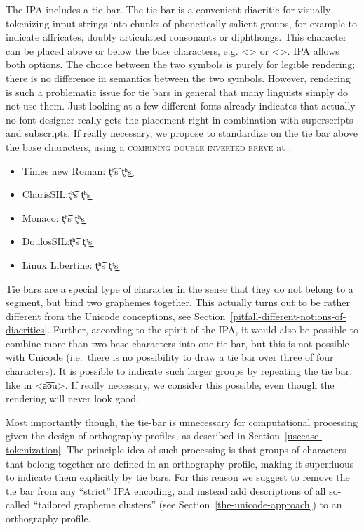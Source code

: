The IPA includes a tie bar. The tie-bar is a convenient diacritic for visually
tokenizing input strings into chunks of phonetically salient groups, for example
to indicate affricates, doubly articulated consonants or diphthongs. This
character can be placed above or below the base characters, e.g. <>
or <>. IPA allows both options. The choice between the two symbols
is purely for legible rendering; there is no difference in semantics between the
two symbols. However, rendering is such a problematic issue for tie bars in
general that many linguists simply do not use them. Just looking at a few
different fonts already indicates that actually no font designer really gets the
placement right in combination with superscripts and subscripts. If really
necessary, we propose to standardize on the tie bar above the base characters,
using a \textsc{combining double inverted breve} at .

\begin{itemize}[itemsep=6pt]
  \item[] {Times new Roman: t̥ʰ͡s t̥ʰ͜s}
  \item[] {\small {}CharisSIL:\@ t̥ʰ͡s t̥ʰ͜s}
  \item[] {\footnotesize {}Monaco: t̥ʰ͡s t̥ʰ͜s}
  \item[] {DoulosSIL:\@ t̥ʰ͡s t̥ʰ͜s}
  \item[] Linux Libertine: t̥ʰ͡s t̥ʰ͜s
\end{itemize}

Tie bars are a special type of character in the sense that they do not belong to
a segment, but bind two graphemes together. This actually turns out to be rather
different from the Unicode conceptions, see
Section~\ref{pitfall-different-notions-of-diacritics}. Further, according to the
spirit of the IPA, it would also be possible to combine more than two base
characters into one tie bar, but this is not possible with Unicode (i.e.~there
is no possibility to draw a tie bar over three of four characters). It is
possible to indicate such larger groups by repeating the tie bar, like in
<a͡o͡u>. If really necessary, we consider this possible, even though the
rendering will never look good. 

Most importantly though, the tie-bar is unnecessary for computational processing
given the design of orthography profiles, as described in
Section~\ref{usecase-tokenization}. The principle idea of such processing is
that groups of characters that belong together are defined in an orthography
profile, making it superfluous to indicate them explicitly by tie bars. For this
reason we suggest to remove the tie bar from any ``strict'' IPA encoding, and
instead add descriptions of all so-called ``tailored grapheme clusters'' (see
Section~\ref{the-unicode-approach}) to an orthography profile.


